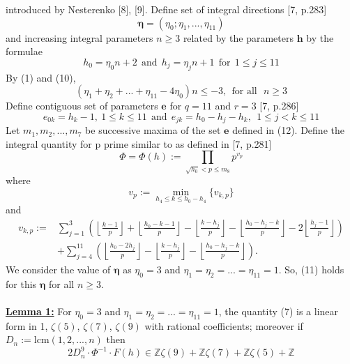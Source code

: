 \documentclass[12pt]{article}
\begin{document}
introduced by Nesterenko [8], [9]. Define set of integral directions [7, p.283] \begin{equation}
    \boldsymbol{\eta}=(\eta_0;\eta_1,...,\eta_{11})
\end{equation}
and increasing integral parameters $n\geq 3$ related by the parameters $\boldsymbol{h}$ by the formulae\begin{equation}
    h_0=\eta_0 n+2\ \ \text{and}\ \ h_j=\eta_j n+1\ \ \text{for}\ \ 1\leq j\leq 11
\end{equation}
By (1) and (10),
\begin{equation}
    (\eta_1+\eta_2+...+\eta_{11}-4\eta_0)n\leq -3,\ \ \text{for all}\ \ \ n\geq 3
\end{equation}
Define contiguous set of parameters $\boldsymbol{e}$ for $q=11$ and $r=3$ [7, p.286] \begin{equation}
    e_{0k}=h_k-1,\ 1\leq k\leq 11 \ \ \text{and}\ \ e_{jk}=h_0-h_j-h_k,\ \ 1\leq j<k\leq 11
\end{equation} Let $m_1,m_2,...,m_7$ be successive maxima of the set $\boldsymbol{e}$ defined in (12). Define the integral quantity for p prime similar to as defined in [7, p.281]
\begin{equation}
    \Phi=\Phi(h):=\prod_{\sqrt{h_0}<p\leq m_8} p^{v_p}
\end{equation}
where \begin{equation}
    v_p:=\min_{h_4\leq k\leq h_0-h_4} \{v_{k,p}\}
\end{equation}
and \begin{equation}
\begin{aligned}
v_{k,p}:={}&
\sum_{j=1}^3
\left(
\left\lfloor\frac{k-1}{p}\right\rfloor
+\left\lfloor\frac{h_0-k-1}{p}\right\rfloor
-\left\lfloor\frac{k-h_j}{p}\right\rfloor
-\left\lfloor\frac{h_0-h_j-k}{p}\right\rfloor
-2\left\lfloor\frac{h_j-1}{p}\right\rfloor
\right)\\
&+
\sum_{j=4}^{11}
\left(
\left\lfloor\frac{h_0-2h_j}{p}\right\rfloor
-\left\lfloor\frac{k-h_j}{p}\right\rfloor
-\left\lfloor\frac{h_0-h_j-k}{p}\right\rfloor
\right).
\end{aligned}
\end{equation}
We consider the value of $\boldsymbol{\eta}$ as $\eta_0=3$ and $\eta_1=\eta_2=...=\eta_{11}=1$. So, (11) holds for this $\boldsymbol{\eta}$ for all $n\geq 3$. \\\\
\textbf{\underline{Lemma 1:}} For $\eta_0=3$ and $\eta_1=\eta_2=...=\eta_{11}=1$, the quantity (7) is a linear form in 1, $\zeta(5)$, $\zeta(7)$, $\zeta(9)$ with rational coefficients; moreover if $D_n:=\text{lcm}(1,2,...,n)$ then\begin{equation*}
   2D_n^9\cdot\Phi^{-1}\cdot F(h)\in\mathbb{Z}\zeta(9)+\mathbb{Z}\zeta(7)+\mathbb{Z}\zeta(5)+\mathbb{Z}
\end{equation*}
\end{document}
